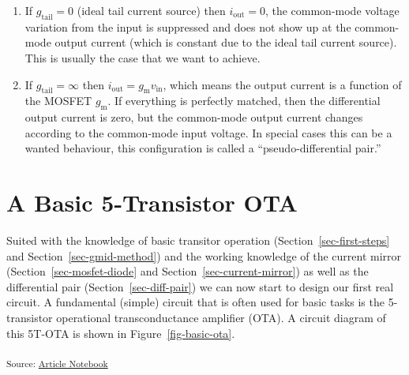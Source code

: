 \documentclass[
  a4paper,
  DIV=11,
  numbers=noendperiod]{scrartcl}
\providecommand{\tightlist}{%
  \setlength{\itemsep}{0pt}\setlength{\parskip}{0pt}}\usepackage{longtable,booktabs,array}
\begin{document}
\begin{enumerate}
\def\labelenumi{\arabic{enumi}.}
\tightlist
\item
  If \(g_\mathrm{tail} = 0\) (ideal tail current source) then
  \(i_\mathrm{out} = 0\), the common-mode voltage variation from the
  input is suppressed and does not show up at the common-mode output
  current (which is constant due to the ideal tail current source). This
  is usually the case that we want to achieve.
\item
  If \(g_\mathrm{tail} = \infty\) then
  \(i_\mathrm{out} = g_\mathrm{m}v_\mathrm{in}\), which means the output
  current is a function of the MOSFET \(g_\mathrm{m}\). If everything is
  perfectly matched, then the differential output current is zero, but
  the common-mode output current changes according to the common-mode
  input voltage. In special cases this can be a wanted behaviour, this
  configuration is called a ``pseudo-differential pair.''
\end{enumerate}

\section{A Basic 5-Transistor OTA}\label{sec-basic-ota}

Suited with the knowledge of basic transitor operation
(Section~\ref{sec-first-steps} and Section~\ref{sec-gmid-method}) and
the working knowledge of the current mirror
(Section~\ref{sec-mosfet-diode} and Section~\ref{sec-current-mirror}) as
well as the differential pair (Section~\ref{sec-diff-pair}) we can now
start to design our first real circuit. A fundamental (simple) circuit
that is often used for basic tasks is the 5-transistor operational
transconductance amplifier (OTA). A circuit diagram of this 5T-OTA is
shown in Figure~\ref{fig-basic-ota}.

\textsubscript{Source:
\href{https://iic-jku.github.io/analog-circuit-design/index.qmd.html}{Article
Notebook}}
\end{document}
